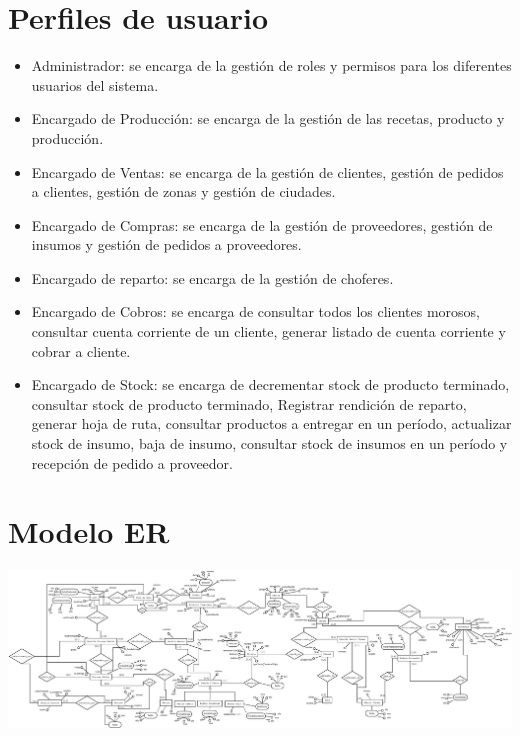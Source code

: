\documentclass[letterpaper,10pt,english]{sphinxmanual}
\begin{document}
\section{Perfiles de usuario}
\label{proyecto:perfiles-de-usuario}\begin{itemize}
\item {} 
Administrador: se encarga de la gestión de roles y permisos para los diferentes usuarios del sistema.

\item {} 
Encargado de Producción: se encarga de la gestión de las recetas, producto y producción.

\item {} 
Encargado de Ventas: se encarga de la gestión de clientes, gestión de pedidos a clientes, gestión de zonas y gestión de ciudades.

\item {} 
Encargado de Compras: se encarga de la gestión de proveedores, gestión de insumos y gestión de pedidos a proveedores.

\item {} 
Encargado de reparto: se encarga de la gestión de choferes.

\item {} 
Encargado de Cobros: se encarga de consultar todos los clientes morosos, consultar cuenta corriente de un cliente, generar listado de cuenta corriente y cobrar a cliente.

\item {} 
Encargado de Stock: se encarga de decrementar stock de producto terminado, consultar stock de producto terminado, Registrar rendición de reparto, generar hoja de ruta, consultar productos a entregar en un período, actualizar stock de insumo, baja de insumo, consultar stock de insumos en un período y recepción de pedido a proveedor.

\end{itemize}


\section{Modelo ER}
\label{proyecto:modelo-er}
\includegraphics{modeloER.jpeg}
\end{document}
